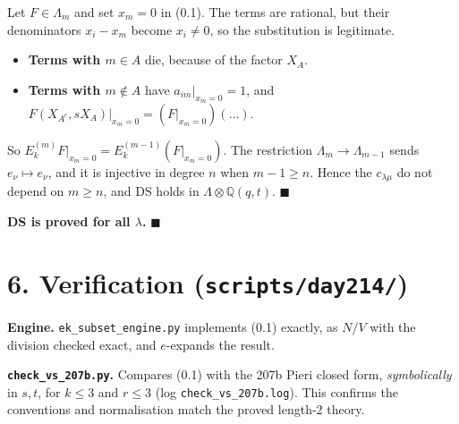 \documentclass[11pt]{article}
\theoremstyle{definition}
\newcommand{\Q}{\mathbb{Q}}
\newcommand{\file}[1]{\texttt{#1}}
\begin{document}
Let $F \in \Lambda_m$ and set $x_m = 0$ in (0.1). The terms are rational, but their denominators $x_i - x_m$ become $x_i \ne 0$, so the substitution is legitimate.
\begin{itemize}
\item \textbf{Terms with $m \in A$} die, because of the factor $X_A$.
\item \textbf{Terms with $m \notin A$} have $a_{im}|_{x_m=0} = 1$, and $F(X_{A^c}, sX_A)|_{x_m=0} = (F|_{x_m=0})(\ldots)$.
\end{itemize}
So $E_k^{(m)}F|_{x_m=0} = E_k^{(m-1)}(F|_{x_m=0})$. The restriction $\Lambda_m \to \Lambda_{m-1}$ sends $e_\nu \mapsto e_\nu$, and it is injective in degree $n$ when $m - 1 \ge n$. Hence the $c_{\lambda\mu}$ do not depend on $m \ge n$, and DS holds in $\Lambda \otimes \Q(q,t)$. \hfill$\blacksquare$

\medskip
\noindent\textbf{DS is proved for all $\lambda$.} \hfill$\blacksquare$

\section*{6. Verification (\file{scripts/day214/})}

\noindent\textbf{Engine.} \file{ek\_subset\_engine.py} implements (0.1) exactly, as $N/V$ with the division checked exact, and $e$-expands the result.

\noindent\textbf{\file{check\_vs\_207b.py}.} Compares (0.1) with the 207b Pieri closed form, \emph{symbolically} in $s,t$, for $k \le 3$ and $r \le 3$ (log \file{check\_vs\_207b.log}). This confirms the conventions and normalisation match the proved length-2 theory.
\end{document}
